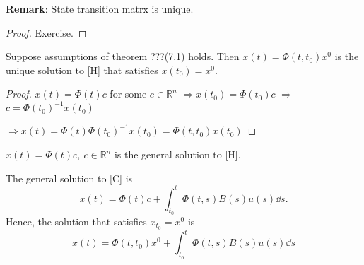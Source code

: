 \documentclass[twoside]{article}
\newcommand\imp{$\Longrightarrow$}
\begin{document}
\textbf{Remark}: State transition matrx is unique.
\begin{proof}
    Exercise.
\end{proof}

\begin{theorem}
    Suppose assumptions of theorem ???(7.1) holds. Then $x(t) = \Phi(t,t_0)x^0$ is the unique solution to [H] that satisfies $x(t_0) = x^{0}$.
\end{theorem}
\begin{proof}
    $x(t) = \Phi(t)c$ for some $c \in \mathbb{R}^n$ \imp $x(t_0) = \Phi(t_0)c$ \imp $c = \Phi(t_0)^{-1} x(t_{0})$

    \imp $x(t)= \Phi(t)\Phi(t_0)^{-1}x(t_0) = \Phi(t,t_0)x(t_0)$
\end{proof}

\begin{remark}
    $x(t) = \Phi(t) c, ~c \in \mathbb{R}^{n}$ is the general solution to [H].
\end{remark}

\begin{theorem}
    The general solution to [C] is 
    \begin{equation}
        x(t) = \Phi(t) c + \int_{t_{0}}^{t} \Phi(t,s) B(s) u(s) \dd s.
    \end{equation}
    Hence, the solution that satisfies $x_{t_{0}} = x^{0}$ is \begin{equation}
        x(t) = \Phi(t,t_{0}) x^{0} + \int_{t_{0}}^{t} \Phi(t,s) B(s) u(s) \dd s
    \end{equation}
\end{theorem}
\end{document}
